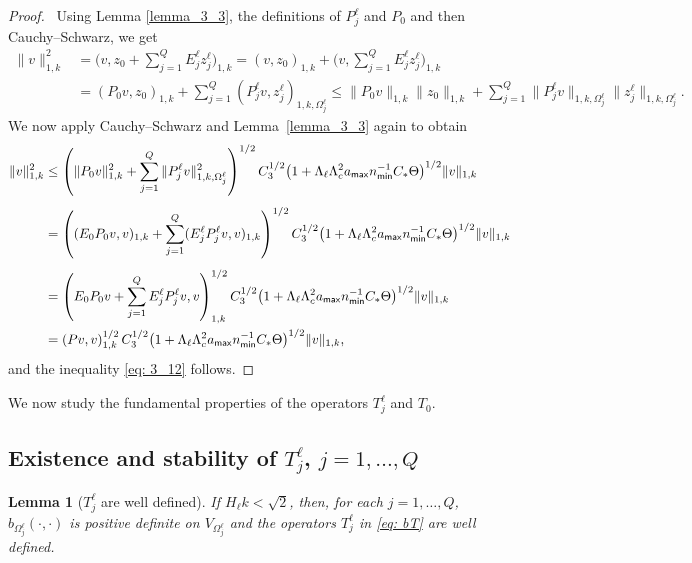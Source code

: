 \documentclass[numbers,webpdf,imaiai]{ima-authoring-template}%
\theoremstyle{thmstyletwo}%
\newtheorem{lemma}[theorem]{Lemma}
\numberwithin{equation}{section}
\newcommand{\Cstar}{C_{\ast}}
\numberwithin{equation}{section}
\newcommand{\amax}{a_{\textup{\textsf{max}}}}
\newcommand{\nmin}{n_{\textup{\textsf{min}}}}
\begin{document}
{\begin{proof}\,
Using Lemma \ref{lemma_3_3}, the definitions  of $P_j^\ell$ and $P_0$ and then Cauchy--Schwarz,  we get
\begin{align*}
	\|v\|_{1,k}^2 &= \Biggl(v, z_0 + \sum_{j=1}^{Q} {E_j^\ell} {z_j^\ell}\Biggr)_{1,k} 
	= (v, z_0)_{1,k} + \Biggl(v,\sum_{j=1}^{Q} {E_j^\ell} {z_j^\ell}\Biggr)_{1,k} \\ 
    &= (P_0v, z_0)_{1,k} + \sum_{j=1}^{Q}( {P_j^\ell} v, {z_j^\ell})_{1,k, {\Omega^\ell_j}} 
    \le \| P_0v\|_{1,k} \|z_0\|_{1,k} + \sum_{j=1}^{Q}\| {P_j^\ell} v \|_{1,k, {\Omega^\ell_j}} \|{z_j^\ell}\|_{1,k, {\Omega^\ell_j}}{.} 
\end{align*}
We now apply  Cauchy--Schwarz and  Lemma~\ref{lemma_3_3} again to obtain
\begin{align*}
	\|v\|_{1,k}^2
	&\le \left(\| P_0v\|_{1,k}^2 + \sum_{j=1}^{Q}\| {P_j^\ell} v \|_{1,k, {\Omega^\ell_j}}^2 \right)^{1/2}
	C_3^{1/2}\bigl(1 + \Lambda_\ell \Lambda_c^2 \amax \nmin^{-1} \Cstar \Theta \bigr)^{1/2} \|v\|_{1,k} \\[1ex]
	&= \left(( E_0 P_0v, v)_{1,k} + \sum_{j=1}^{Q} ( {E_j^\ell} {P_j^\ell} v, v)_{1,k} \right)^{1/2}  
	C_3^{1/2}\bigl(1 + \Lambda_\ell \Lambda_c^2 \amax \nmin^{-1} \Cstar \Theta \bigr)^{1/2}\|v\|_{1,k} \\[1ex]
	&= \left( E_0 P_0 v + \sum_{j=1}^{Q}{E_j^\ell} {P_j^\ell} v, v \right)_{1,k}^{1/2}
	C_3^{1/2}\bigl(1 + \Lambda_\ell \Lambda_c^2 \amax \nmin^{-1} \Cstar \Theta \bigr)^{1/2} \|v\|_{1,k} \\
	&= (P v,v)_{1,k}^{1/2} \, C_3^{1/2}\bigl(1 + \Lambda_\ell \Lambda_c^2 \amax \nmin^{-1} \Cstar \Theta \bigr)^{1/2}\|v\|_{1,k},
\end{align*}
and the inequality \eqref{eq: 3_12} follows. 
\end{proof}

We now study the fundamental properties of the operators $T_j^\ell$ and $T_0$.

\subsection[Existence and stability of ${T_j^\ell}$, $j=1,\ldots,Q$]{Existence and stability of {\boldmath${T_j^\ell}$}, {\boldmath$j=1,\ldots,Q$}}

\begin{lemma}[$T_j^\ell$ are well defined]
\label{lemma_3_4}
If ${H_\ell} k < \sqrt{2}$, then, for each $j=1, \ldots, Q$,  $b_{{\Omega^\ell_j}}(\cdot,\cdot)$ is positive definite
on $V_{\Omega_j^\ell}$ and the operators ${T_j^\ell}$ in \eqref{eq: bT} are well defined.
\end{lemma}

}
\end{document}
